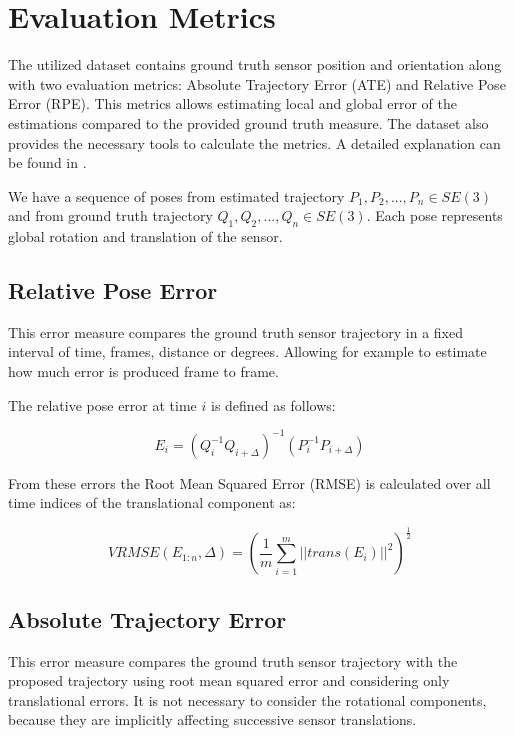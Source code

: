 \section{Evaluation Metrics}

The utilized dataset contains ground truth sensor position and orientation along with two 
evaluation metrics: Absolute Trajectory Error (ATE) and Relative Pose Error (RPE). This metrics 
allows estimating local and global error of the estimations compared to the provided ground truth measure. The dataset
 also provides the necessary tools to calculate the metrics. A detailed explanation can be found in \cite{sturm12iros}.

We have a sequence of poses from estimated trajectory $P_1,P_2,...,P_n \in SE(3)$ and from ground truth trajectory 
$Q_1,Q_2,...,Q_n \in SE(3)$. Each pose represents global rotation and translation of the sensor.



\subsection{Relative Pose Error}

This error measure compares the ground truth sensor trajectory in a fixed interval of time, frames, distance or degrees. 
Allowing for example to estimate how much error is produced frame to frame.

The relative pose error at time $i$ is defined as follows:

\begin{equation}
E_i = ( Q_i^{-1} Q_{i+\Delta})^{-1}(P_i^{-1}P_{i+\Delta})
\end{equation}

From these errors the Root Mean Squared Error (RMSE) is calculated over all time indices of the translational component as:

\begin{equation}
VRMSE(E_{1:n},\Delta) = (\frac{1}{m} \sum_{i=1}^m ||trans(E_i)||^2 )^{\frac{1}{2}}
\end{equation}


\subsection{Absolute Trajectory Error}

This error measure compares the ground truth sensor trajectory with the proposed trajectory using root mean 
squared error and considering only translational errors. It is not necessary to consider the rotational components, 
because they are implicitly affecting successive sensor translations.

